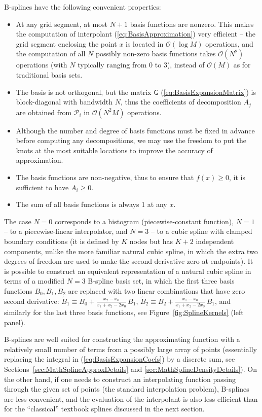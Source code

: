 \documentclass[12pt]{article}
\begin{document}
B-splines have the following convenient properties:
\begin{itemize}
\item At any grid segment, at most $N+1$ basis functions are nonzero. This makes the computation of interpolant (\ref{eq:BasisApproximation}) very efficient -- the grid segment enclosing the point $x$ is located in $\mathcal{O}(\log M)$ operations, and the computation of all $N$ possibly non-zero basis functions takes $\mathcal{O}(N^2)$ operations (with $N$ typically ranging from 0 to 3), instead of $\mathcal{O}(M)$ as for traditional basis sets.
\item The basis is not orthogonal, but the matrix $\mathsf G$ (\ref{eq:BasisExpansionMatrix}) is block-diagonal with bandwidth $N$, thus the coefficients of decomposition $A_j$ are obtained from $\mathcal P_i$ in $\mathcal{O}(N^2M)$ operations.
\item Although the number and degree of basis functions must be fixed in advance before computing any decompositions, we may use the freedom to put the knots at the most suitable locations to improve the accuracy of approximation.
\item The basis functions are non-negative, thus to ensure that $f(x) \ge 0$, it is sufficient to have $A_i\ge 0$. 
\item The sum of all basis functions is always 1 at any $x$.
\end{itemize}

The case $N=0$ corresponds to a histogram (piecewise-constant function), $N=1$ -- to a piecewise-linear interpolator, and $N=3$ -- to a cubic spline with clamped boundary conditions (it is defined by $K$ nodes but has $K+2$ independent components, unlike the more familiar natural cubic spline, in which the extra two degrees of freedom are used to make the second derivative zero at endpoints). It is possible to construct an equivalent representation of a natural cubic spline in terms of a modified $N=3$ B-spline basis set, in which the first three basis functions $B_0, B_1, B_2$ are replaced with two linear combinations that have zero second derivative: $\tilde B_1 \equiv B_0 + \frac{x_2-x_0}{x_1+x_2-2x_0}\,B_1$, $\tilde B_2 \equiv B_2 + \frac{x_1-x_0}{x_1+x_2-2x_0}\,B_1$, and similarly for the last three basis functions, see Figure~\ref{fig:SplineKernels} (left panel).

B-splines are well suited for constructing the approximating function with a relatively small number of terms from a possibly large array of points (essentially replacing the integral in (\ref{eq:BasisExpansionCoefs}) by a discrete sum, see Sections~\ref{sec:MathSplineApproxDetails} and \ref{sec:MathSplineDensityDetails}). %
On the other hand, if one needs to construct an interpolating function passing through the given set of points (the standard interpolation problem), B-splines are less convenient, and the evaluation of the interpolant is also less efficient than for the ``classical'' textbook splines discussed in the next section.
\end{document}
